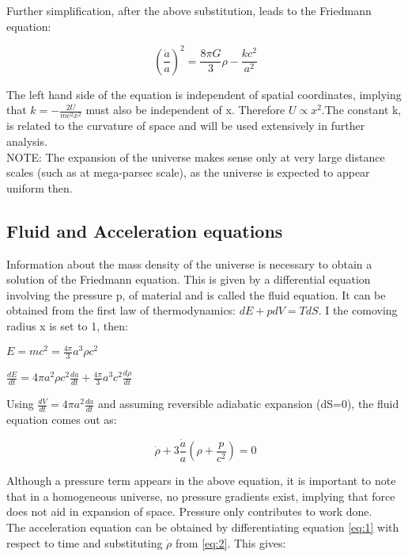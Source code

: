 Further simplification, after the above substitution, leads to the Friedmann equation:

\begin{equation} \label{eq:1}
(\frac{\dot{a}}{a})^2 = \frac{8{\pi}G}{3}\rho -\frac{kc^2}{a^2}
\end{equation}

The left hand side of the equation is independent of spatial coordinates, implying that $k = -\frac{2U}{m{c^2}{x^2}}$ must also be independent of x. Therefore $U \propto {x^2}$.The constant k, is related to the curvature of space and will be used extensively in further analysis. \\

NOTE: The expansion of the universe makes sense only at very large distance scales (such as at mega-parsec scale), as the universe is expected to appear uniform then. 

\subsection{Fluid and Acceleration equations}
Information about the mass density of the universe is necessary to obtain a solution of the Friedmann equation. This is given by a differential equation involving the pressure p, of material and is called the fluid equation. It can be obtained from the first law of thermodynamics: $dE+pdV = TdS $. I the comoving radius x is set to 1, then:

\begin{center}
    $E = mc^2 = \frac{4\pi}{3}a^3{\rho}c^2$ \\
\end{center}
    
\begin{center}    
    $\frac{dE}{dt} = 4{\pi}a^2{\rho}c^2\frac{da}{dt}+\frac{4\pi}{3}a^3c^2\frac{d\rho}{dt}$
\end{center}

Using $\frac{dV}{dt} = 4{\pi}a^2\frac{da}{dt}$ and assuming reversible adiabatic expansion (dS=0), the fluid equation comes out as:

\begin{equation} \label{eq:2}
    \dot{\rho}+3\frac{\dot{a}}{a}(\rho+\frac{p}{c^2})=0
\end{equation}

Although a pressure term appears in the above equation, it is important to note that in a homogeneous universe, no pressure gradients exist, implying that force does not aid in expansion of space. Pressure only contributes to work done.
\\
The acceleration equation can be obtained by differentiating equation \ref{eq:1} with respect to time and substituting $\dot{\rho}$ from \ref{eq:2}. This gives:

